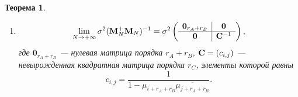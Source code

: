 \documentclass[12pt,a4paper]{article}
\newtheorem{theorem}{Теорема}
\begin{document}
\begin{theorem}
\begin{enumerate}
	    \item 
	    \begin{equation*}
	    \lim_{N \to + \infty} \sigma^2 (\mathbf{M}_N^+ \mathbf{M}_N)^{-1} = \sigma^2 \left( \begin{array}{c|c}
	    \mathbf{0}_{r_A + r_B} & \mathbf{0} \\ \hline
	    \mathbf{0} & \mathbf{C}^{-1}
	    \end{array}  \right),
	    \end{equation*}
	    где $\mathbf{0}_{r_A + r_B}$ --- нулевая матрица порядка $r_A + r_B$, $\mathbf{C} = (c_{i,j})$ --- невырожденная квадратная матрица порядка $r_C$, элементы которой равны
	    \begin{equation*}
	    c_{i, j} = \frac{1}{1 - \mu_{i+r_A+r_B} \overline{\mu_{j+r_A+r_B}}}.
	    \end{equation*}
	\end{enumerate}
\end{theorem}
	
\end{document}
